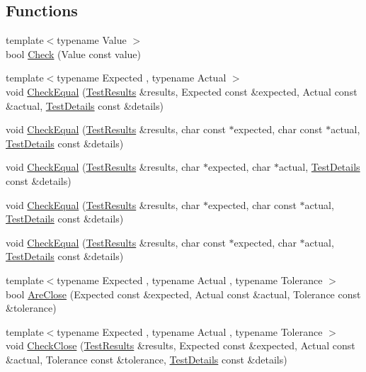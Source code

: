 \subsection*{Functions}
\begin{CompactItemize}
\item 
{\footnotesize template$<$typename Value $>$ }\\bool \hyperlink{namespace_unit_test_82fb37498b485a4ba7ec60d2b2505d60}{Check} (Value const value)
\item 
{\footnotesize template$<$typename Expected , typename Actual $>$ }\\void \hyperlink{namespace_unit_test_da1d55be7d7f0be93e7e18b7153306bb}{CheckEqual} (\hyperlink{class_unit_test_1_1_test_results}{TestResults} \&results, Expected const \&expected, Actual const \&actual, \hyperlink{class_unit_test_1_1_test_details}{TestDetails} const \&details)
\item 
void \hyperlink{namespace_unit_test_a1d95c47467cdc478fd4a3310060c62e}{CheckEqual} (\hyperlink{class_unit_test_1_1_test_results}{TestResults} \&results, char const $\ast$expected, char const $\ast$actual, \hyperlink{class_unit_test_1_1_test_details}{TestDetails} const \&details)
\item 
void \hyperlink{namespace_unit_test_6220237fc4a12beb675d834cc0062aa8}{CheckEqual} (\hyperlink{class_unit_test_1_1_test_results}{TestResults} \&results, char $\ast$expected, char $\ast$actual, \hyperlink{class_unit_test_1_1_test_details}{TestDetails} const \&details)
\item 
void \hyperlink{namespace_unit_test_bfd1f36d8211da65b2fbd37fdc2b2329}{CheckEqual} (\hyperlink{class_unit_test_1_1_test_results}{TestResults} \&results, char $\ast$expected, char const $\ast$actual, \hyperlink{class_unit_test_1_1_test_details}{TestDetails} const \&details)
\item 
void \hyperlink{namespace_unit_test_229093d68e4f13b6afd140dc17573446}{CheckEqual} (\hyperlink{class_unit_test_1_1_test_results}{TestResults} \&results, char const $\ast$expected, char $\ast$actual, \hyperlink{class_unit_test_1_1_test_details}{TestDetails} const \&details)
\item 
{\footnotesize template$<$typename Expected , typename Actual , typename Tolerance $>$ }\\bool \hyperlink{namespace_unit_test_afe3bb3286a28db229c210679f35a90b}{AreClose} (Expected const \&expected, Actual const \&actual, Tolerance const \&tolerance)
\item 
{\footnotesize template$<$typename Expected , typename Actual , typename Tolerance $>$ }\\void \hyperlink{namespace_unit_test_4086d446da4d2df0cb8fd6f121f74b8b}{CheckClose} (\hyperlink{class_unit_test_1_1_test_results}{TestResults} \&results, Expected const \&expected, Actual const \&actual, Tolerance const \&tolerance, \hyperlink{class_unit_test_1_1_test_details}{TestDetails} const \&details)

\end{CompactItemize}
